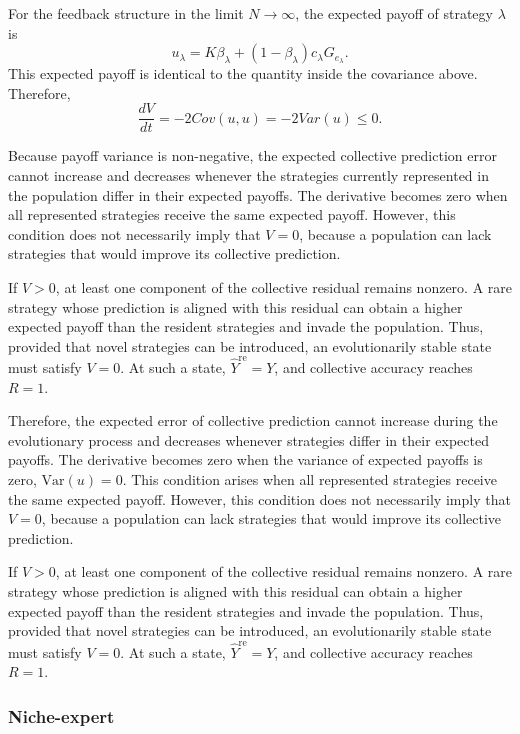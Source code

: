 \documentclass[12pt]{article}
\begin{document}
For the feedback structure in the limit $N\to\infty$, the expected payoff of strategy $\lambda$ is
\begin{equation}
u_\lambda = K\beta_\lambda+(1-\beta_\lambda)c_\lambda G_{e_\lambda}.
\end{equation}
This expected payoff is identical to the quantity inside the covariance above. 
Therefore,
\begin{equation}
\frac{dV}{dt} = -2Cov(u,u) = -2Var(u) \leq 0.
\end{equation}

Because payoff variance is non-negative, the expected collective prediction error cannot increase and decreases whenever the strategies currently represented in the population differ in their expected payoffs. 
The derivative becomes zero when all represented strategies receive the same expected payoff. 
However, this condition does not necessarily imply that $V=0$, because a population can lack strategies that would improve its collective prediction.

If $V>0$, at least one component of the collective residual remains nonzero. 
A rare strategy whose prediction is aligned with this residual can obtain a higher expected payoff than the resident strategies and invade the population. 
Thus, provided that novel strategies can be introduced, an evolutionarily stable state must satisfy $V=0$. 
At such a state, $\hat{Y}^{\mathrm{re}}=Y$, and collective accuracy reaches $R=1$.



Therefore, the expected error of collective prediction cannot increase during the evolutionary process and decreases whenever strategies differ in their expected payoffs. 
The derivative becomes zero when the variance of expected payoffs is zero, $\mathrm{Var}(u)=0$.
This condition arises when all represented strategies receive the same expected payoff.
However, this condition does not necessarily imply that $V=0$, because a population can lack strategies that would improve its collective prediction.

If $V>0$, at least one component of the collective residual remains nonzero. 
A rare strategy whose prediction is aligned with this residual can obtain a higher expected payoff than the resident strategies and invade the population. 
Thus, provided that novel strategies can be introduced, an evolutionarily stable state must satisfy $V=0$. 
At such a state, $\hat{Y}^{\mathrm{re}}=Y$, and collective accuracy reaches $R=1$.

\subsubsection{Niche-expert}
\end{document}
